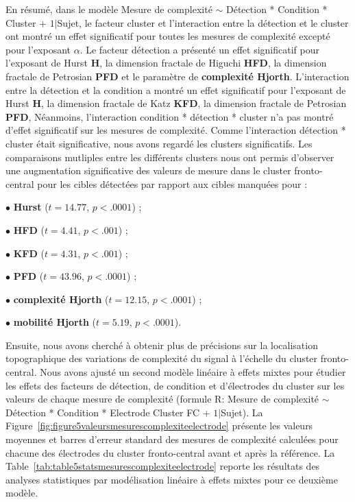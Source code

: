 En résumé, dans le modèle Mesure de complexité $\sim$ Détection * Condition * Cluster + $1|$Sujet, le facteur cluster et l'interaction entre la détection et le cluster ont montré un effet significatif pour toutes les mesures de complexité excepté pour l'exposant $\alpha$. 
Le facteur détection a présenté un effet significatif pour l'exposant de Hurst \textbf{H}, la dimension fractale de Higuchi \textbf{HFD}, la dimension fractale de Petrosian \textbf{PFD} et le paramètre de \textbf{complexité Hjorth}. 
L'interaction entre la détection et la condition a montré un effet significatif pour l'exposant de Hurst \textbf{H}, la dimension fractale de Katz \textbf{KFD}, la dimension fractale de Petrosian \textbf{PFD}, 
Néanmoins, l'interaction condition * détection * cluster n'a pas montré d'effet significatif sur les mesures de complexité.  
Comme l'interaction détection * cluster était significative, nous avons regardé les clusters significatifs. 
Les comparaisons mutliples entre les différents clusters nous ont permis d'observer une augmentation significative des valeurs de mesure dans le cluster fronto-central pour les cibles détectées par rapport aux cibles manquées pour : 

\begin{itemize}
\begin{multicols}{2}
\item[$\bullet$] \textbf{Hurst} ($t=14.77$, $p<.0001$) ;
\item[$\bullet$] \textbf{HFD} ($t=4.41$, $p<.001$) ;
\item[$\bullet$] \textbf{KFD} ($t=4.31$, $p<.001$) ; 
\item[$\bullet$] \textbf{PFD} ($t=43.96$, $p<.0001$) ; 
\item[$\bullet$] \textbf{complexité Hjorth} ($t=12.15$, $p<.0001$) ;
\item[$\bullet$] \textbf{mobilité Hjorth} ($t=5.19$, $p<.0001$). \\
\end{multicols}
\end{itemize}

Ensuite, nous avons cherché à obtenir plus de précisions sur la localisation topographique des variations de complexité du signal à l'échelle du cluster fronto-central. 
Nous avons ajusté un second modèle linéaire à effets mixtes pour étudier les effets des facteurs de détection, de condition et d'électrodes du cluster sur les valeurs de chaque mesure de complexité (formule R: Mesure de complexité $\sim$ Détection * Condition * Electrode Cluster FC + $1|$Sujet). 
La Figure~\ref{fig:figure5valeursmesurescomplexiteelectrode} présente les valeurs moyennes et barres d'erreur standard des mesures de complexité calculées pour chacune des électrodes du cluster fronto-central avant et après la référence. 
La Table~\ref{tab:table5statsmesurescomplexiteelectrode} reporte les résultats des analyses statistiques par modélisation linéaire à effets mixtes pour ce deuxième modèle. \\

